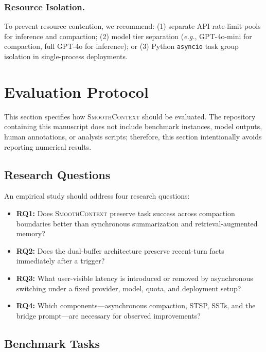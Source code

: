 \documentclass[10pt,twocolumn]{article}
\newcommand{\sys}{\textsc{SmoothContext}}
\newcommand{\eg}{\textit{e.g.}}
\begin{document}
\subsubsection{Resource Isolation.}

To prevent resource contention, we recommend: (1) separate API rate-limit pools for inference and compaction; (2) model tier separation (\eg, GPT-4o-mini for compaction, full GPT-4o for inference); or (3) Python \texttt{asyncio} task group isolation in single-process deployments.


\section{Evaluation Protocol}\label{sec:experiments}

This section specifies how \sys{} should be evaluated. The repository containing this manuscript does not include benchmark instances, model outputs, human annotations, or analysis scripts; therefore, this section intentionally avoids reporting numerical results.

\subsection{Research Questions}

An empirical study should address four research questions:
\begin{itemize}
  \item \textbf{RQ1:} Does \sys{} preserve task success across compaction boundaries better than synchronous summarization and retrieval-augmented memory?
  \item \textbf{RQ2:} Does the dual-buffer architecture preserve recent-turn facts immediately after a trigger?
  \item \textbf{RQ3:} What user-visible latency is introduced or removed by asynchronous switching under a fixed provider, model, quota, and deployment setup?
  \item \textbf{RQ4:} Which components---asynchronous compaction, STSP, SSTs, and the bridge prompt---are necessary for observed improvements?
\end{itemize}

\subsection{Benchmark Tasks}\label{sec:benchmarks}
\end{document}
